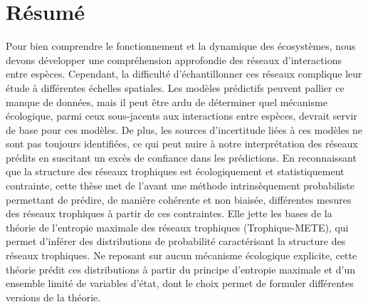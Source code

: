\documentclass[12pt,twoside,phd]{dms}
\numberwithin{equation}{section}
\numberwithin{table}{chapter}
\numberwithin{figure}{chapter}
\begin{document}
\maketitle
\newpage
\maketitle

\doublespacing


\francais

\setlength{\parskip}{6pt} %

\chapter*{Résumé}

Pour bien comprendre le fonctionnement et la dynamique des écosystèmes, nous
devons développer une compréhension approfondie des réseaux d'interactions entre
espèces. Cependant, la difficulté d'échantillonner ces réseaux complique leur
étude à différentes échelles spatiales. Les modèles prédictifs peuvent pallier
ce manque de données, mais il peut être ardu de déterminer quel mécanisme
écologique, parmi ceux sous-jacents aux interactions entre espèces, devrait
servir de base pour ces modèles. De plus, les sources d'incertitude liées à ces
modèles ne sont pas toujours identifiées, ce qui peut nuire à notre
interprétation des réseaux prédits en suscitant un excès de confiance dans les
prédictions. En reconnaissant que la structure des réseaux trophiques est
écologiquement et statistiquement contrainte, cette thèse met de l'avant une
méthode intrinsèquement probabiliste permettant de prédire, de manière cohérente
et non biaisée, différentes mesures des réseaux trophiques à partir de ces
contraintes. Elle jette les bases de la théorie de l'entropie maximale des
réseaux trophiques (Trophique-METE), qui permet d'inférer des distributions de
probabilité caractérisant la structure des réseaux trophiques. Ne reposant sur
aucun mécanisme écologique explicite, cette théorie prédit ces distributions à
partir du principe d'entropie maximale et d'un ensemble limité de variables
d'état, dont le choix permet de formuler différentes versions de la théorie. 
\end{document}
